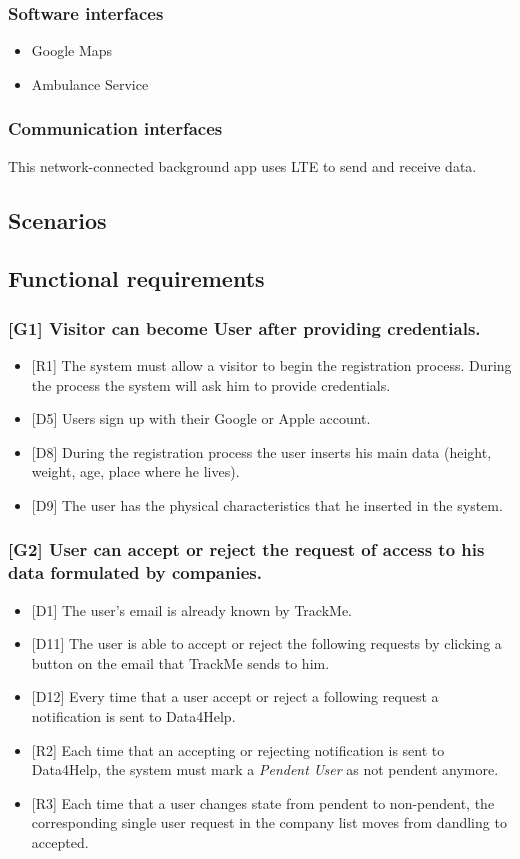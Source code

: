\documentclass{article}
\begin{document}
\subsubsection{Software interfaces}
\begin{itemize}
	\item Google Maps
	\item Ambulance Service
\end{itemize}
\subsubsection{Communication interfaces}
This network-connected background app uses LTE to send and receive data.
\subsection{Scenarios}
\subsection{Functional requirements}
\subsubsection{[G1] Visitor can become User after providing credentials.}
\begin{itemize}
\item {[R1]} The system must allow a visitor to begin the registration process. During the process the system will ask him to provide credentials.
\item {[D5]} Users sign up with their Google or Apple account.
\item {[D8]} During the registration process the user inserts his main data (height, weight, age, place where he lives).
\item {[D9]} The user has the physical characteristics that he inserted in the system.
\end{itemize}
\subsubsection{[G2] User can accept or reject the request of access to his data formulated by companies.}
\begin{itemize}
\item {[D1]} The user's email is already known by TrackMe.
\item {[D11]} The user is able to accept or reject the following requests by clicking a button on the email that TrackMe sends to him.
\item {[D12]} Every time that a user accept or reject a following request a notification is sent to Data4Help.
\item {[R2]} Each time that an accepting or rejecting notification is sent to Data4Help, the system must mark a \emph{Pendent User} as not pendent anymore.
\item {[R3]} Each time that a user changes state from pendent to non-pendent, the corresponding single user request in the company list moves from dandling to accepted.
\end{itemize}
\end{document}
